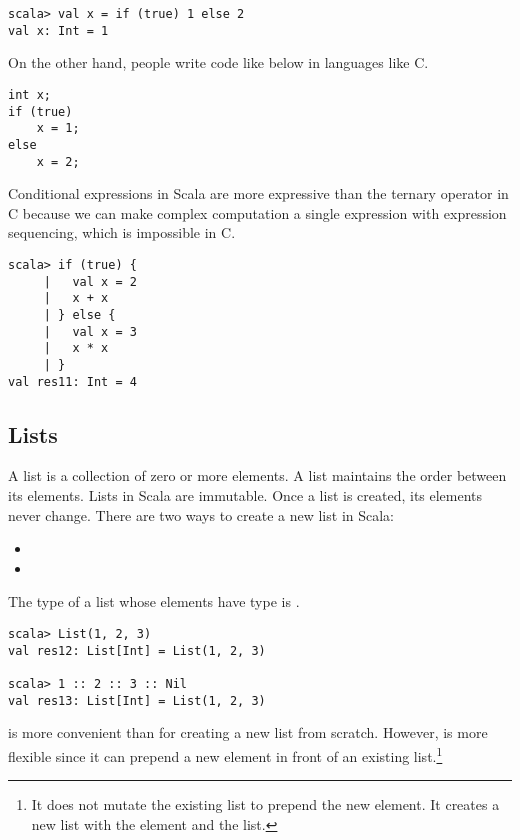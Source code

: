 \begin{verbatim}
scala> val x = if (true) 1 else 2
val x: Int = 1
\end{verbatim}

On the other hand, people write code like below in languages like C.

\begin{verbatim}
int x;
if (true)
    x = 1;
else
    x = 2;
\end{verbatim}

Conditional expressions in Scala are more expressive than the ternary operator
in C because we can make complex computation a single expression with expression
sequencing, which is impossible in C.

\begin{verbatim}
scala> if (true) {
     |   val x = 2
     |   x + x
     | } else {
     |   val x = 3
     |   x * x
     | }
val res11: Int = 4
\end{verbatim}

\subsection{Lists}

A list is a collection of zero or more elements. A list maintains the order between
its elements. Lists in Scala are immutable. Once a list is created, its elements
never change. There are two ways to create a new list in Scala:

\begin{itemize}
  \item {}
  \item {}
\end{itemize}

The type of a list whose elements have type  is .

\begin{verbatim}
scala> List(1, 2, 3)
val res12: List[Int] = List(1, 2, 3)

scala> 1 :: 2 :: 3 :: Nil
val res13: List[Int] = List(1, 2, 3)
\end{verbatim}

 is more convenient than \code{::} for creating a new list from
scratch. However, \code{::} is more flexible since it can prepend a new element
in front of an existing list.\footnote{It does not mutate the existing list to
prepend the new element. It creates a new list with the element and the list.}

